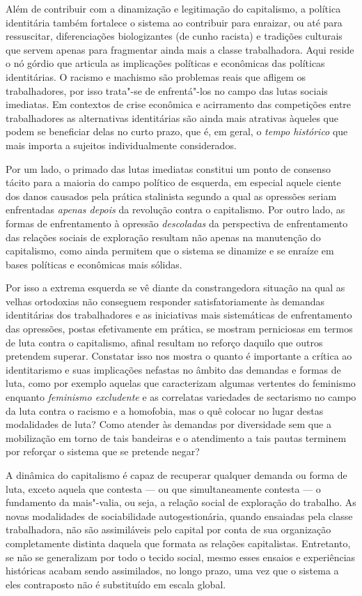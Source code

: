 Além de contribuir com a dinamização e legitimação do capitalismo, a
política identitária também fortalece o sistema ao contribuir para
enraizar, ou até para ressuscitar, diferenciações biologizantes (de
cunho racista) e tradições culturais que servem apenas para fragmentar
ainda mais a classe trabalhadora. Aqui reside o nó górdio que articula
as implicações políticas e econômicas das políticas identitárias. O
racismo e machismo são problemas reais que afligem os trabalhadores, por
isso trata"-se de enfrentá"-los no campo das lutas sociais imediatas. Em
contextos de crise econômica e acirramento das competições entre
trabalhadores as alternativas identitárias são ainda mais atrativas
àqueles que podem se beneficiar delas no curto prazo, que é, em geral, o
\emph{tempo histórico} que mais importa a sujeitos individualmente
considerados.

Por um lado, o primado das lutas imediatas constitui um ponto de
consenso tácito para a maioria do campo político de esquerda, em
especial aquele ciente dos danos causados pela prática
stalinista segundo a qual as opressões seriam enfrentadas
\emph{apenas depois} da revolução contra o capitalismo. Por
outro lado, as formas de enfrentamento à opressão
\emph{descoladas} da perspectiva de enfrentamento das relações sociais
de exploração resultam não apenas na manutenção do capitalismo, como
ainda permitem que o sistema se dinamize e se enraíze em bases políticas
e econômicas mais sólidas.

Por isso a extrema esquerda se vê diante da constrangedora situação na
qual as velhas ortodoxias não conseguem responder satisfatoriamente às
demandas identitárias dos trabalhadores e as iniciativas mais
sistemáticas de enfrentamento das opressões, postas efetivamente em
prática, se mostram perniciosas em termos de luta contra o capitalismo,
afinal resultam no reforço daquilo que outros pretendem superar.
Constatar isso nos mostra o quanto é importante a crítica ao
identitarismo e suas implicações nefastas no âmbito das demandas e
formas de luta, como por exemplo aquelas que caracterizam algumas
vertentes do feminismo enquanto \emph{feminismo excludente} e as
correlatas variedades de sectarismo no campo da luta contra o racismo e
a homofobia, mas o quê colocar no lugar destas modalidades de luta? Como
atender às demandas por diversidade sem que a mobilização em torno de
tais bandeiras e o atendimento a tais pautas terminem por reforçar o
sistema que se pretende negar?

A dinâmica do capitalismo é capaz de recuperar qualquer demanda
ou forma de luta, exceto aquela que contesta --- ou que simultaneamente
contesta --- o fundamento da mais"-valia, ou seja, a relação social de
exploração do trabalho. As novas
modalidades de sociabilidade autogestionária, quando ensaiadas pela classe trabalhadora, não são assimiláveis pelo capital por conta de sua organização
completamente distinta daquela que formata as relações capitalistas.
Entretanto, se não se generalizam por todo o tecido social, mesmo esses
ensaios e experiências históricas acabam sendo assimilados, no longo
prazo, uma vez que o sistema a eles contraposto não é substituído em
escala global.

